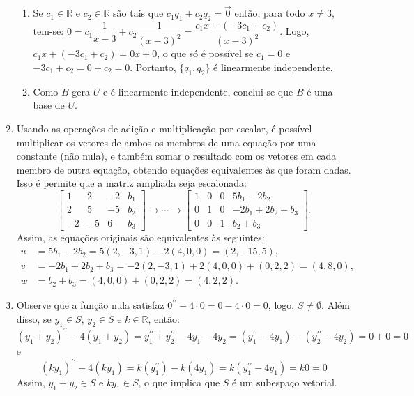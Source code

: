 \documentclass[12pt,a4paper]{article}
\newcommand*\R{\mathbb{R}}
\begin{document}
\begin{enumerate}
\begin{enumerate}
\item Se $c_1 \in \R$ e $c_2 \in \R$ são tais que  $c_1 q_1 + c_2q_2 = \vec{0}$ então, para todo $x\neq 3$, tem-se:
$0 = c_1 \dfrac{1}{x-3} + c_2 \dfrac{1}{(x-3)^2}
   = \dfrac{c_1x+(-3c_1+c_2)}{(x-3)^2}$.
Logo, $c_1x+(-3c_1 + c_2) = 0x+0$, o que só é possível se $c_1=0$ e $-3c_1 + c_2 = 0 + c_2 = 0$. Portanto, $\{q_1,q_2\}$ é linearmente independente.
\item Como $B$ gera $U$ e é linearmente independente, conclui-se que $B$ é uma base de $U$.
\end{enumerate}
\item Usando as operações de adição e multiplicação por escalar, é possível multiplicar os vetores de ambos os membros de uma equação por uma constante (não nula), e também somar o resultado com os vetores em cada membro de outra equação, obtendo equações equivalentes às que foram dadas. Isso é permite que a matriz ampliada seja escalonada:
\[
\begin{bmatrix}
 1 &  2 & -2 & b_1\\
 2 &  5 & -5 & b_2\\
-2 & -5 &  6 & b_3
\end{bmatrix}
\rightarrow
\cdots
\rightarrow
\begin{bmatrix}
 1 & 0 & 0 & 5b_1 - 2b_2\\
 0 & 1 & 0 & -2b_1+2b_2+b_3\\
 0 & 0 & 1 & b_2+b_3
\end{bmatrix}.
\]
Assim, as equações originais são equivalentes às seguintes:
\begin{align*}
u &= 5b_1 - 2b_2
   = 5(2,-3,1) - 2(4,0,0)
   = (2,-15,5),\\
v &= -2b_1+2b_2+b_3
   = -2(2,-3,1)+2(4,0,0)+(0,2,2)
   = (4,8,0),\\
w &= b_2+b_3
   = (4,0,0)+(0,2,2)
   = (4,2,2).
\end{align*}

\item Observe que a função nula satisfaz $0^{\prime\prime}-4\cdot 0 = 0 - 4\cdot 0 = 0$, logo, $S \neq \emptyset$. Além disso, se $y_1 \in S$, $y_2 \in S$ e $k \in \R$, então:
\[
  (y_1 + y_2)^{\prime\prime}-4(y_1+y_2)
= y_1^{\prime\prime} + y_2^{\prime\prime}-4y_1-4y_2
= (y_1^{\prime\prime}-4y_1)
 -(y_2^{\prime\prime}-4y_2)
= 0 + 0 = 0
\]
e
\[
  (k y_1)^{\prime\prime}-4(k y_1)
= k (y_1^{\prime\prime})-k(4y_1)
= k (y_1^{\prime\prime}-4y_1)
= k 0 = 0
\]
Assim, $y_1+y_2 \in S$ e $ky_1 \in S$, o que implica que $S$ é um subespaço vetorial.


\end{enumerate}
\end{document}
